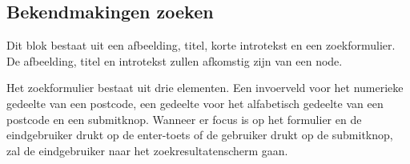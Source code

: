 \subsection{Bekendmakingen zoeken}
\label{sec:bekendmakingenzoeken}
Dit blok bestaat uit een afbeelding, titel, korte introtekst en een zoekformulier. De afbeelding, titel en introtekst zullen afkomstig zijn van een node.

Het zoekformulier bestaat uit drie elementen. Een invoerveld voor het numerieke gedeelte van een postcode, een gedeelte voor het alfabetisch gedeelte van een postcode en een submitknop. Wanneer er focus is op het formulier en de eindgebruiker drukt op de enter-toets of de gebruiker drukt op de submitknop, zal de eindgebruiker naar het zoekresultatenscherm gaan.